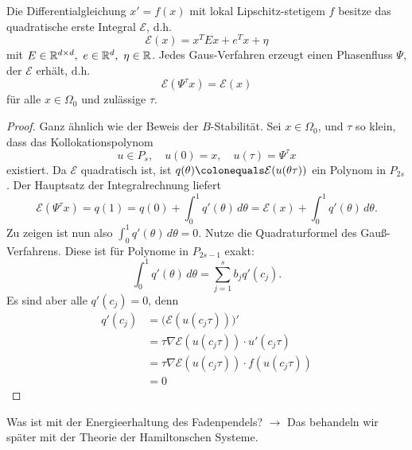 \begin{satz}
	Die Differentialgleichung $x'=f(x)$ mit lokal Lipschitz-stetigem $f$ besitze das quadratische erste Integral $\mathcal E$, d.h.
	\begin{equation*}
		\mathcal E(x) = x^T E x + e^T x + \eta
	\end{equation*}
	mit $E\in\R^{d\times d},\ e\in\R^d,\ \eta\in\R$. Jedes Gaus-Verfahren erzeugt einen Phasenfluss $\Psi$, der $\mathcal E$ erhält, d.h.
	\begin{equation*}
		\mathcal E(\Psi^\tau x) = \mathcal E(x)
	\end{equation*}
	für alle $x\in\Omega_0$ und zulässige $\tau$.
\end{satz}
\begin{proof}
	Ganz ähnlich wie der Beweis der $B$-Stabilität.
	Sei $x\in\Omega_0$, und $\tau$ so klein, dass das Kollokationspolynom
	\begin{equation*}
		u\in P_s,\quad u(0)=x,\quad u(\tau) = \Psi^\tau x
	\end{equation*}
	existiert. Da $\mathcal E$ quadratisch ist, ist $q(\theta) \colonequals \mathcal E(u(\theta\tau))$ ein Polynom in $P_{2s}$.
	Der Hauptsatz der Integralrechnung liefert
	\begin{equation*}
		\mathcal E(\Psi^\tau x) = q(1) = q(0) + \int_0^1q'(\theta)\,d\theta = \mathcal E(x) + \int_0^1q'(\theta)\,d\theta . 
	\end{equation*}
	Zu zeigen ist nun also $\int_0^1q'(\theta)\,d\theta =0$.
	Nutze die Quadraturformel des Gauß-Verfahrens. Diese ist für Polynome in $P_{2s-1}$ exakt:
	\begin{equation*}
		\int_0^1q'(\theta)\,d\theta = \sum_{j=1}^s b_j q'(c_j).
	\end{equation*}
	Es sind aber alle $q'(c_j)=0$, denn
	\begin{align*}
		q'(c_j) 
		&= \big(\mathcal E(u(c_j\tau))\big)' \\
		&= \tau\nabla\mathcal E(u(c_j\tau))\cdot u'(c_j\tau) \tag{Kettenregel} \\
		&= \tau\nabla\mathcal E(u(c_j\tau))\cdot f(u(c_j\tau)) \tag{Kollokationseigenschaft} \\
		&= 0 \tag{da $\mathcal E$ eine Invariante ist}
	\end{align*}
\end{proof}

Was ist mit der Energieerhaltung des Fadenpendels? $\to$ Das behandeln wir später mit der Theorie der Hamiltonschen Systeme.